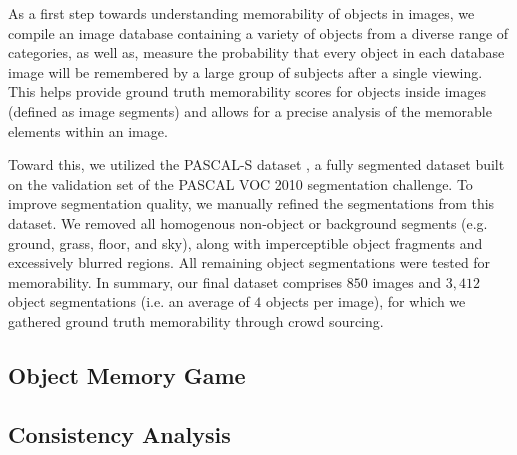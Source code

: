As a first step towards understanding memorability of objects in
images, we compile an image database containing a variety of objects
from a diverse range of categories, as well as, measure the
probability that every object in each database image will be
remembered by a large group of subjects after a single viewing.
%
This
helps provide ground truth memorability scores for objects inside
images (defined as image segments) and allows for a precise analysis
of the memorable elements within an image.


%
Toward this, we utilized the
PASCAL-S dataset \cite{yin14}, a fully segmented dataset built on the
validation set of the PASCAL VOC 2010 \cite{pascal10} segmentation
challenge. To improve segmentation quality, we manually refined the
segmentations from this dataset. We removed all homogenous non-object
or background segments (e.g. ground, grass, floor, and sky), along
with imperceptible object fragments and excessively blurred
regions. All remaining object segmentations were tested for
memorability. In summary, our final dataset comprises $850$ images and
$3,412$ object segmentations (i.e. an average of $4$ objects per
image), for which we gathered ground truth memorability through crowd
sourcing. %


\subsection{Object Memory Game}


\subsection{Consistency Analysis}

